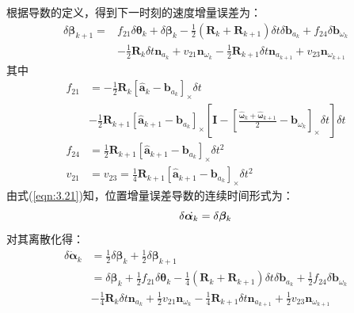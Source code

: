根据导数的定义，得到下一时刻的速度增量误差为：
\begin{equation}
\label{eqn:3.46}
\begin{aligned}
\delta \bm{\beta}_{k+1}=& f_{21} \delta \bm{\theta}_{k}+\delta \bm{\beta}_{k}-\frac{1}{2}\left( \mathbf{R}_{k}+\mathbf{R}_{k+1}\right) \delta t \delta \mathbf{b}_{a_{k}}+f_{24} \delta \mathbf{b}_{\omega_{k}} \\ 
& -\frac{1}{2} \mathbf{R}_{k} \delta t \mathbf{n}_{a_{k}} +v_{21} \mathbf{n}_{\omega_{k}}-\frac{1}{2} \mathbf{R}_{k+1} \delta t \mathbf{n}_{a_{k+1}}+v_{23} \mathbf{n}_{\omega_{k+1}}
\end{aligned}
\end{equation}
其中
\begin{equation}
\label{eqn:3.47}
\begin{aligned}
f_{21} &= -\frac{1}{2} \mathbf{R}_{k}\left[\hat{\mathbf{a}}_{k}-\mathbf{b}_{a_{k}}\right]_\times \delta t \\
& -\frac{1}{2} \mathbf{R}_{k+1}\left[\hat{\mathbf{a}}_{k+1}-\mathbf{b}_{a_{k}}\right]_\times\left[\mathbf{I}-\left[\frac{\hat{\bm{\omega}}_{k}+\hat{\bm{\omega}}_{k+1}}{2}-\mathbf{b}_{\omega_{k}}\right]_\times \delta t\right] \delta t \\
f_{24} &= \frac{1}{2} \mathbf{R}_{k+1}\left[\hat{\mathbf{a}}_{k+1}-\mathbf{b}_{a_{k}}\right]_\times \delta t^{2} \\
v_{21} &= v_{23}=\frac{1}{4} \mathbf{R}_{k+1}\left[\hat{\mathbf{a}}_{k+1}-\mathbf{b}_{a_{k}}\right]_\times \delta t^{2}
\end{aligned}
\end{equation}
由式(\ref{eqn:3.21})知，位置增量误差导数的连续时间形式为：
\begin{equation}
\label{eqn:3.48}
\setlength{\abovedisplayskip}{6pt}
\setlength{\belowdisplayskip}{6pt}
\delta \dot{\bm{\alpha}_k}=\delta \bm{\beta}_k
\end{equation}
对其离散化得：
\begin{equation}
\label{eqn:3.49}
\begin{aligned}
\delta \dot{\bm{\alpha}}_{k} &= \frac{1}{2} \delta \bm{\beta}_{k}+\frac{1}{2} \delta \bm{\beta}_{k+1} \\
&=\delta \bm{\beta}_{k}+\frac{1}{2} f_{21} \delta \bm{\theta}_{k}-\frac{1}{4}\left( \mathbf{R}_{k}+\mathbf{R}_{k+1}\right) \delta t \delta \mathbf{b}_{a_{k}}+\frac{1}{2} f_{24} \delta \mathbf{b}_{\omega_{k}} \\ 
& -\frac{1}{4} \mathbf{R}_{k} \delta t \mathbf{n}_{a_{k}} +\frac{1}{2} v_{21} \mathbf{n}_{\omega_{k}}-\frac{1}{4} \mathbf{R}_{k+1} \delta t \mathbf{n}_{a_{k+1}}+\frac{1}{2} v_{23} \mathbf{n}_{\omega_{k+1}}
\end{aligned}
\end{equation}
